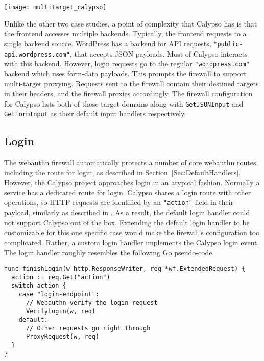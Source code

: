 \begin{center}
\texttt{[image: multitarget\_calypso]}
\end{center}

Unlike the other two case studies, a point of complexity that Calypso has is that the frontend accesses multiple backends. Typically, the frontend requests to a single backend source. WordPress has a backend for API requests, \lstinline{"public-api.wordpress.com"}, that accepts JSON payloads. Most of Calypso interacts with this backend. However, login requests go to the regular \lstinline{"wordpress.com"} backend which uses form-data payloads. This prompts the firewall to support multi-target proxying. Requests sent to the firewall contain their destined targets in their headers, and the firewall proxies accordingly. The firewall configuration for Calypso lists both of those target domains along with \lstinline{GetJSONInput} and \lstinline{GetFormInput} as their default input handlers respectively. 

\subsection{Login}\label{Sec:CalypsoLogin}

The webauthn firewall automatically protects a number of core webauthn routes, including the route for login, as described in Section~\ref{Sec:DefaultHandlers}. However, the Calypso project approaches login in an atypical fashion. Normally a service has a dedicated route for login. Calypso shares a login route with other operations, so HTTP requests are identified by an \lstinline{"action"} field in their payload, similarly as described in \label{Sec:CustomHandlers}. As a result, the default login handler could not support Calypso out of the box. Extending the default login handler to be customizable for this one specific case would make the firewall's configuration too complicated. Rather, a custom login handler implements the Calypso login event. The login handler roughly resembles the following Go pseudo-code.

\begin{lstlisting}
func finishLogin(w http.ResponseWriter, req *wf.ExtendedRequest) {
  action := req.Get("action")
  switch action {
    case "login-endpoint":
      // Webauthn verify the login request
      VerifyLogin(w, req)
    default:
      // Other requests go right through
      ProxyRequest(w, req)
  }
}
\end{lstlisting}

